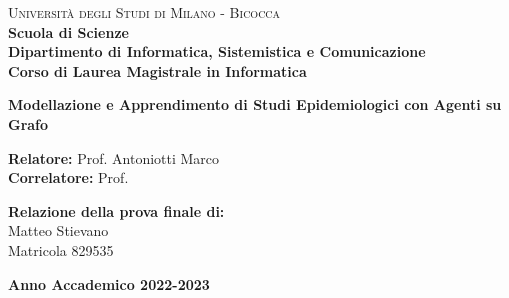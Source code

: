 \begin{titlepage}

    \noindent
    \begin{minipage}[t]{0.19\textwidth}
    \end{minipage}
    \begin{minipage}[t]{0.81\textwidth}
    {
            {\textsc{Università degli Studi di Milano - Bicocca}} \\
            \textbf{Scuola di Scienze} \\
            \textbf{Dipartimento di Informatica, Sistemistica e Comunicazione} \\
            \textbf{Corso di Laurea Magistrale in Informatica} \\
            \par
    }
    \end{minipage}

\vspace{20mm}

\begin{center}
        {\LARGE{
                \textbf{Modellazione e Apprendimento di Studi Epidemiologici con Agenti su Grafo}
                \par
        }}
    \end{center}

    \vspace{60mm}

    \noindent
    {\large \textbf{Relatore:} Prof. Antoniotti Marco} \\

    \noindent
    {\large \textbf{Correlatore:} Prof. }

    \vspace{10mm}

    \begin{flushright}
        {\large \textbf{Relazione della prova finale di:}} \\
        \large{Matteo Stievano} \\
        \large{Matricola 829535}
    \end{flushright}

    \vspace{20mm}
    \begin{center}
        {\large{\bf Anno Accademico 2022-2023}}
    \end{center}

    \restoregeometry

\end{titlepage}